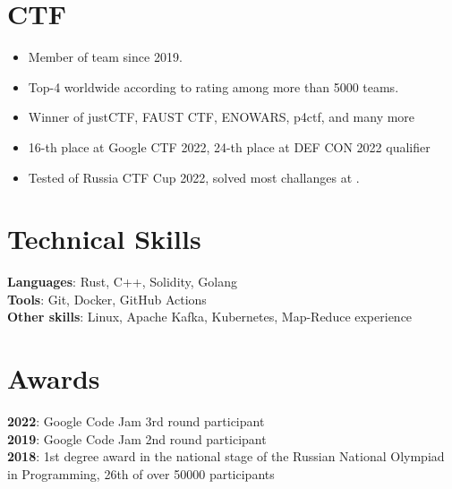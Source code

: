\documentclass[letterpaper,11pt]{article}
\begin{document}
\section {CTF}
\begin{itemize}[leftmargin=0.15in]
  \setlength\itemsep{-5px}
  \item Member of \href{https://ctftime.org/team/83435}{\color{blue}{C4T BuT S4D}} team since 2019.
  \item Top-4 worldwide according to \href{https://ctftime.org}{\color{blue}{ctftime}} rating among more than 5000 teams.
  \item Winner of justCTF, FAUST CTF, ENOWARS, p4ctf, and many more
  \item 16-th place at Google CTF 2022, 24-th place at DEF CON 2022 qualifier
  \item Tested \href{https://github.com/C4T-BuT-S4D/ctfcup-2022-stage3-part1}{\color{blue}{solidity stage}} of Russia CTF Cup 2022, solved most challanges at \href{https://capturetheether.com/challenges/}{\color{blue}{Capture the Ether}}.
\end{itemize}

\section{Technical Skills}
 \begin{itemize}[leftmargin=0.15in, label={}]
    \small{\item{
     \textbf{Languages}{: Rust, C++, Solidity, Golang} \\
     \textbf{Tools}{: Git, Docker, GitHub Actions} \\
     \textbf{Other skills}{: Linux, Apache Kafka, Kubernetes, Map-Reduce experience}
    }}
 \end{itemize}

\section{Awards}
 \begin{itemize}[leftmargin=0.15in, label={}]
    \small{\item{
    \textbf{2022}{: Google Code Jam 3rd round participant} \\
    \textbf{2019}{: Google Code Jam 2nd round participant} \\
    \textbf{2018}{: 1st degree award in the national stage of the Russian National Olympiad in Programming, 26th of over 50000 participants} \\
    }}
 \end{itemize}


\end{document}
